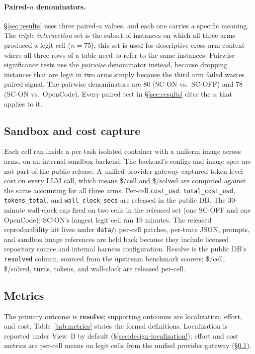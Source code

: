 \paragraph{Paired-$n$ denominators.}
\S\ref{sec:results} uses three paired-$n$ values, and each one carries a specific
meaning. The \emph{triple-intersection} set is the subset of instances on which all
three arms produced a legit cell ($n=75$); this set is used for descriptive cross-arm
context where all three rows of a table need to refer to the same instances. Pairwise
significance tests use the \emph{pairwise} denominator instead, because dropping
instances that are legit in two arms simply because the third arm failed wastes paired
signal. The pairwise denominators are 80 (SC-ON vs.\ SC-OFF) and 78 (SC-ON vs.\
OpenCode). Every paired test in \S\ref{sec:results} cites the $n$ that applies to it.

\subsection{Sandbox and cost capture}
\label{sec:design-sandbox}

Each cell ran inside a per-task isolated container with a uniform image across arms, on
an internal sandbox backend. The backend's configs and image spec are not part of the
public release. A unified provider gateway captured token-level cost on every LLM call,
which means \$/cell and \$/solved are computed against the same accounting for all three
arms. Per-cell \texttt{cost\_usd}, \texttt{total\_cost\_usd}, \texttt{tokens\_total}, and
\texttt{wall\_clock\_secs} are released in the public DB. The 30-minute wall-clock
cap fired on two cells in the released set (one SC-OFF and one OpenCode); SC-ON's
longest legit cell ran 19 minutes. The released reproducibility kit lives under
\texttt{data/}; per-cell patches, per-trace JSON, prompts, and sandbox image references
are held back because they include licensed repository source and internal harness
configuration. Resolve is the public DB's \texttt{resolved} column, sourced from the
upstream benchmark scorers; \$/cell, \$/solved, turns, tokens, and wall-clock are
released per-cell.

\subsection{Metrics}
\label{sec:design-metrics}

The primary outcome is \textbf{resolve}; supporting outcomes are localization, effort,
and cost. Table~\ref{tab:metrics} states the formal definitions. Localization is
reported under View~B by default (\S\ref{sec:design-localization}); effort and cost
metrics are per-cell means on legit cells from the unified provider gateway
(\S\ref{sec:design-sandbox}).

